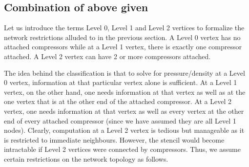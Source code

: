 \documentclass{amsart}
\begin{document}
\subsection{Combination of above given}
Let us introduce the terms Level 0, Level 1 and Level 2 vertices to formalize the network restrictions alluded to in the previous section. 
A Level 0 vertex has no attached compressors while at a Level 1 vertex, there is exactly one compressor attached. 
A Level 2 vertex can have 2 or more compressors attached.
 

The idea behind the classification is that to solve for pressure/density at a Level 0 vertex, information at that particular vertex alone is sufficient. At a Level 1 vertex, on the other hand, one needs information at that vertex as well as at the one vertex that is at the other  end of the attached compressor. 
At a Level 2 vertex, one needs information at that vertex as well as every vertex at the other end of every attached compressor (since we have assumed they are all Level 1 nodes).
Clearly, computation at a Level 2 vertex is tedious but manageable as it is restricted to immediate neighbours. However, the stencil would become intractable if Level 2 vertices were connected by compressors.
Thus, we assume certain restrictions on the network topology as follows.
\end{document}
